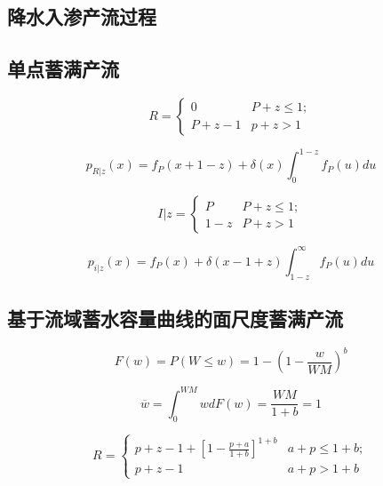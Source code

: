 \documentclass[draft,wrr]{AGUTeX}
\begin{document}
\begin{article}
\section{降水入渗产流过程}
 

 

\subsection{单点蓄满产流}
 
\begin{equation}
R=
 \begin{cases}
 0&{P+z\leq 1};\\P+z-1 &{p+z>1}
 \end{cases}
\end{equation}
 
\begin{equation}
\label{rpoint}
p_{R|z}(x)=f_P(x+1-z)+\delta(x)\int_{0}^{1-z} f_P(u) du 
\end{equation}
 
\begin{equation}
I|z=
 \begin{cases}
 P&{P+z\leq 1};\\1-z &{P+z>1}
 \end{cases}
\end{equation}
 
\begin{equation}
\label{point}
p_{i|z}(x)=f_P(x)+\delta(x-1+z)\int_{1-z}^{\infty} f_P(u) du 
\end{equation}


\subsection{基于流域蓄水容量曲线的面尺度蓄满产流}
 
\begin{equation}
F(w)=P(W \leq w)=1-(1-\frac{w}{WM})^b
\end{equation} 
 
\begin{equation}
\overline{w}=\int_{0}^{WM} wdF(w)=\frac{WM}{1+b}=1
\end{equation} 

 
 
\begin{equation}
R=
 \begin{cases}
 p+z-1+[1-\frac{p+a}{1+b}]^{1+b}&{a+p\leq 1+b};\\p+z-1 &{a+p> 1+b}
 \end{cases}
\end{equation}
 

\end{article}
\end{document}
